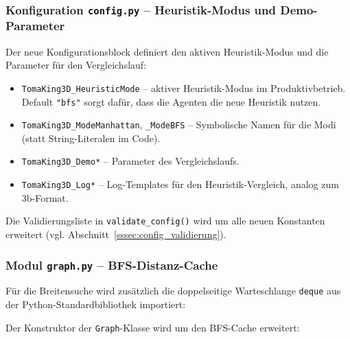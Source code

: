 
\subsubsection{Konfiguration \texttt{config.py} – Heuristik-Modus und Demo-Parameter}

Der neue Konfigurationsblock definiert den aktiven Heuristik-Modus und die Parameter für den Vergleichslauf:



\begin{itemize}
    \item \texttt{TomaKing3D\_HeuristicMode} -- aktiver Heuristik-Modus im Produktivbetrieb. Default \texttt{"bfs"} sorgt dafür, dass die Agenten die neue Heuristik nutzen.
    \item \texttt{TomaKing3D\_ModeManhattan}, \texttt{\_ModeBFS} -- Symbolische Namen für die Modi (statt String-Literalen im Code).
    \item \texttt{TomaKing3D\_Demo*} -- Parameter des Vergleichslaufs.
    \item \texttt{TomaKing3D\_Log*} -- Log-Templates für den Heuristik-Vergleich, analog zum 3b-Format.
\end{itemize}

Die Validierungsliste in \texttt{validate\_config()} wird um alle neuen Konstanten erweitert (vgl. Abschnitt~\ref{sssec:config_validierung}).


\subsubsection{Modul \texttt{graph.py} – \acs{BFS}-Distanz-Cache}

Für die Breitensuche wird zusätzlich die doppelseitige Warteschlange \texttt{deque} aus der Python-Standardbibliothek importiert:



Der Konstruktor der \texttt{Graph}-Klasse wird um den \acs{BFS}-Cache erweitert:


